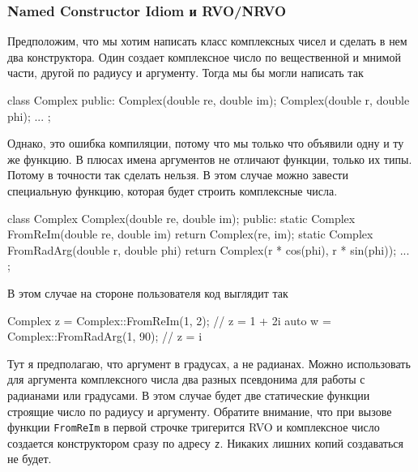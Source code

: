 \subsubsection{Named Constructor Idiom и RVO/NRVO}

Предположим, что мы хотим написать класс комплексных чисел и сделать в нем два конструктора.
Один создает комплексное число по вещественной и мнимой части, другой по радиусу и аргументу.
Тогда мы бы могли написать так
\begin{cppcode}
class Complex {
public:
  Complex(double re, double im);
  Complex(double r, double phi);
  ...
};
\end{cppcode}
Однако, это ошибка компиляции, потому что мы только что объявили одну и ту же функцию.
В плюсах имена аргументов не отличают функции, только их типы.
Потому в точности так сделать нельзя.
В этом случае можно завести специальную функцию, которая будет строить комплексные числа.
\begin{cppcode}
class Complex {
  Complex(double re, double im);
public:
  static Complex FromReIm(double re, double im) {
    return Complex(re, im);
  }
  static Complex FromRadArg(double r, double phi) {
    return Complex(r * cos(phi), r * sin(phi));
  }
  ...
};
\end{cppcode}
В этом случае на стороне пользователя код выглядит так
\begin{cppcode}
Complex z = Complex::FromReIm(1, 2); // z = 1 + 2i
auto w = Complex::FromRadArg(1, 90); // z = i
\end{cppcode}
Тут я предполагаю, что аргумент в градусах, а не радианах.
Можно использовать для аргумента комплексного числа два разных псевдонима для работы с радианами или градусами.
В этом случае будет две статические функции строящие число по радиусу и аргументу.
Обратите внимание, что при вызове функции \verb"FromReIm" в первой строчке тригерится RVO и комплексное число создается конструктором сразу по адресу \verb"z".
Никаких лишних копий создаваться не будет.

